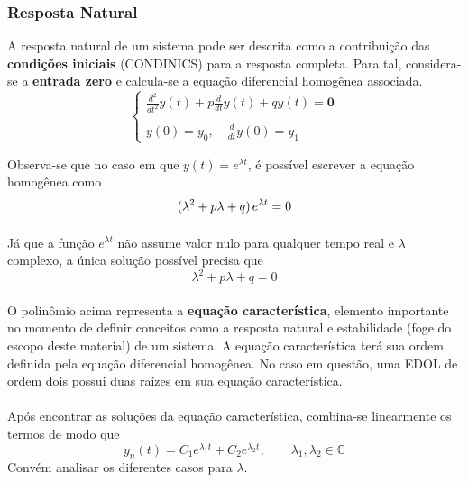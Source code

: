 \documentclass{article}
\numberwithin{equation}{section}
\begin{document}
    \subsubsection{Resposta Natural}
    \label{subsubsec:natural}
    A resposta natural de um sistema pode ser descrita como a contribuição das \textbf{condições iniciais} (CONDINICS) para a resposta completa. Para tal, considera-se a \textbf{entrada zero} e calcula-se a equação diferencial homogênea associada.
    \begin{equation*}
        \begin{cases}
            \displaystyle\frac{d^2}{dt^2}y(t)+p\frac{d}{dt}y(t)+qy(t)=\textbf{0}\\ \\
            \displaystyle{y(0)=y_{0}, \quad \frac{d}{dt}y(0)=y_{1}}
        \end{cases}
    \end{equation*}

    Observa-se que no caso em que $y(t) = e^{\lambda t}$, é possível escrever a equação homogênea como
    \begin{equation*}
        (\lambda^{2}+p\lambda+q)\hspace{0.05cm} e^{\lambda t} = 0
    \end{equation*}
    \paragraph{}Já que a função $e^{\lambda t}$ não assume valor nulo para qualquer tempo real e $\lambda$ complexo, a única solução possível precisa que
    \begin{equation}
        \lambda^{2}+p\lambda+q=0
    \end{equation}
    \paragraph{}O polinômio acima representa a \textbf{equação característica}, elemento importante no momento de definir conceitos como a resposta natural e estabilidade (foge do escopo deste material) de um sistema. A equação característica terá sua ordem definida pela equação diferencial homogênea. No caso em questão, uma EDOL de ordem dois possui duas raízes em sua equação característica.
    \paragraph{}Após encontrar as soluções da equação característica, combina-se linearmente os termos de modo que
    \begin{equation*}
        \displaystyle y_{n}(t)=C_{1}e^{\lambda_{1}t}+C_{2}e^{\lambda_{2}t}, \qquad \lambda_{1},\lambda_{2} \in \mathbb{C}
    \end{equation*}
    Convém analisar os diferentes casos para $\lambda$.
\end{document}
